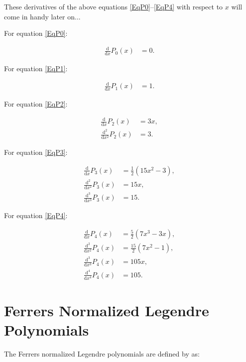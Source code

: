\documentclass[]{article}
\begin{document}
		These derivatives of the above equations \ref{EqP0}--\ref{EqP4} with respect to $x$ will come in handy later on...
		
		For equation \ref{EqP0}:
		
		\begin{align}
			\frac{\text{d}}{\text{d} x}P_0 (x) &= 0. \label{Eqd1P0}
		\end{align}

		For equation \ref{EqP1}:

		\begin{align}
			\frac{\text{d}}{\text{d} x} P_1 (x) &= 1. \label{Eqd1P1}
		\end{align}
		
		For equation \ref{EqP2}:

		\begin{align}
			\frac{\text{d}}{\text{d} x} P_2 (x) &= 3x, \label{Eqd1P2} \\
			\frac{\text{d}^2}{\text{d} x^2} P_2 (x) &= 3. \label{Eqd2P2}
		\end{align}
		
		For equation \ref{EqP3}:
		
		\begin{align}
			\frac{\text{d}}{\text{d} x} P_3 (x) &= \frac{1}{2}(15x^2 - 3), \label{Eqd1P3} \\
			\frac{\text{d}^2}{\text{d} x^2} P_3 (x) &= 15x, \label{Eqd2P3} \\
			\frac{\text{d}^3}{\text{d} x^3} P_3 (x) &= 15. \label{Eqd3P3}
		\end{align}
		
		For equation \ref{EqP4}:

		\begin{align}
			\frac{\text{d}}{\text{d} x} P_4 (x) &= \frac{5}{2}(7x^3 - 3x), \label{Eqd1P4} \\
			\frac{\text{d}^2}{\text{d} x^2} P_4 (x) &= \frac{15}{2}(7x^2 - 1), \label{Eqd2P4} \\
			\frac{\text{d}^3}{\text{d} x^3} P_4 (x) &= 105x, \label{Eqd3P4} \\
			\frac{\text{d}^4}{\text{d} x^4} P_4 (x) &= 105. \label{Eqd4P4}
		\end{align}
			
\section{Ferrers Normalized Legendre Polynomials}

	The Ferrers normalized Legendre polynomials are defined by \cite{Ferrers1877} as:
	
\end{document}
